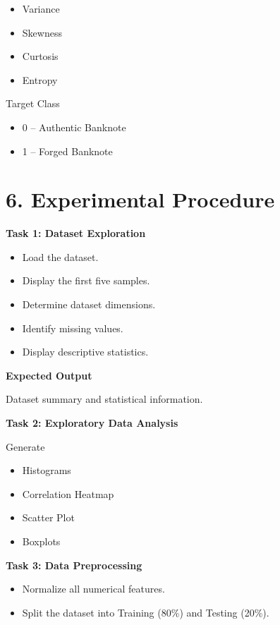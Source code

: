 \documentclass[11pt]{article}
\begin{document}
\begin{itemize}
\item Variance
\item Skewness
\item Curtosis
\item Entropy
\end{itemize}

Target Class

\begin{itemize}
\item 0 -- Authentic Banknote
\item 1 -- Forged Banknote
\end{itemize}


\section*{6. Experimental Procedure}

\textbf{Task 1: Dataset Exploration}

\begin{itemize}
\item Load the dataset.
\item Display the first five samples.
\item Determine dataset dimensions.
\item Identify missing values.
\item Display descriptive statistics.
\end{itemize}

\textbf{Expected Output}

Dataset summary and statistical information.

\vspace{2mm}

\textbf{Task 2: Exploratory Data Analysis}

Generate

\begin{itemize}
\item Histograms
\item Correlation Heatmap
\item Scatter Plot
\item Boxplots
\end{itemize}

\vspace{2mm}

\textbf{Task 3: Data Preprocessing}

\begin{itemize}
\item Normalize all numerical features.
\item Split the dataset into Training (80\%) and Testing (20\%).
\end{itemize}
\end{document}

